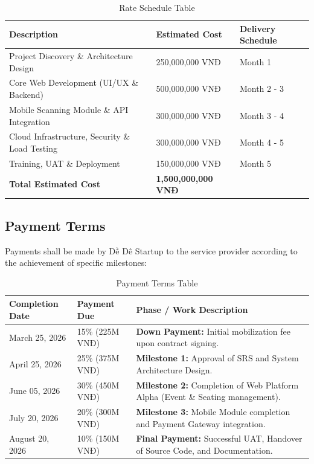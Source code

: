 \begin{table}[H]
\centering
\renewcommand{\arraystretch}{1.5}
\begin{tabular}{|p{}|p{}|p{}|}
\hline
\rowcolor[HTML]{EFEFEF} 
\textbf{Description} & \textbf{Estimated Cost} & \textbf{Delivery Schedule} \\ \hline
Project Discovery \& Architecture Design & 250,000,000 VNĐ & Month 1 \\ \hline
Core Web Development (UI/UX \& Backend) & 500,000,000 VNĐ & Month 2 - 3 \\ \hline
Mobile Scanning Module \& API Integration & 300,000,000 VNĐ & Month 3 - 4 \\ \hline
Cloud Infrastructure, Security \& Load Testing & 300,000,000 VNĐ & Month 4 - 5 \\ \hline
Training, UAT \& Deployment & 150,000,000 VNĐ & Month 5 \\ \hline
\rowcolor[HTML]{F2F2F2}
\textbf{Total Estimated Cost} & \textbf{1,500,000,000 VNĐ} & \\ \hline
\end{tabular}
\caption{Rate Schedule Table}
\end{table}

\subsection{Payment Terms}
Payments shall be made by Dề Dê Startup to the service provider according to the achievement of specific milestones:

\begin{table}[H]
\centering
\renewcommand{\arraystretch}{1.5}
\begin{tabular}{|p{}|p{}|p{}|}
\hline
\rowcolor[HTML]{EFEFEF} 
\textbf{Completion Date} & \textbf{Payment Due} & \textbf{Phase / Work Description} \\ \hline
March 25, 2026 & 15\% (225M VNĐ) & \textbf{Down Payment:} Initial mobilization fee upon contract signing. \\ \hline
April 25, 2026 & 25\% (375M VNĐ) & \textbf{Milestone 1:} Approval of SRS and System Architecture Design. \\ \hline
June 05, 2026 & 30\% (450M VNĐ) & \textbf{Milestone 2:} Completion of Web Platform Alpha (Event \& Seating management). \\ \hline
July 20, 2026 & 20\% (300M VNĐ) & \textbf{Milestone 3:} Mobile Module completion and Payment Gateway integration. \\ \hline
August 20, 2026 & 10\% (150M VNĐ) & \textbf{Final Payment:} Successful UAT, Handover of Source Code, and Documentation. \\ \hline
\end{tabular}
\caption{Payment Terms Table}
\end{table}